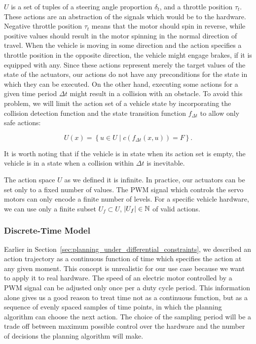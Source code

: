 $U$ is a set of tuples of a steering angle proportion $\delta_t$, and a throttle position $\tau_t$. These actions are an abstraction of the signals which would be to the hardware. Negative throttle position $\tau_t$ means that the motor should spin in reverse, while positive values should result in the motor spinning in the normal direction of travel. When the vehicle is moving in some direction and the action specifies a throttle position in the opposite direction, the vehicle might engage brakes, if it is equipped with any. Since these actions represent merely the target values of the state of the actuators, our actions do not have any preconditions for the state in which they can be executed. On the other hand, executing some actions for a given time period $\Delta t$ might result in a collision with an obstacle. To avoid this problem, we will limit the action set of a vehicle state by incorporating the collision detection function and the state transition function $f_{\Delta t}$ to allow only safe actions:


\[
U(x)=\left\{u\in U \mid c(f_{\Delta t}(x, u)) = F\right\}.
\]

It is worth noting that if the vehicle is in state when its action set is empty, the vehicle is in a state when a collision within $\Delta t$ is inevitable.

The action space $U$ as we defined it is infinite. In practice, our actuators can be set only to a fixed number of values. The \gls*{PWM} signal which controls the servo motors can only encode a finite number of levels. For a specific vehicle hardware, we can use only a finite subset $U_f\subset U$, $\left|{U_f}\right|\in\mathbb{N}$ of valid actions.

\subsubsection{Discrete-Time Model}

Earlier in Section~\ref{sec:planning_under_differential_constraints}, we described an action trajectory as a continuous function of time which specifies the action at any given moment. This concept is unrealistic for our use case because we want to apply it to real hardware. The speed of an electric motor controlled by a \gls{PWM} signal can be adjusted only once per a duty cycle period. This information alone gives us a good reason to treat time not as a continuous function, but as a sequence of evenly spaced samples of time points, in which the planning algorithm can choose the next action. The choice of the sampling period will be a trade off between maximum possible control over the hardware and the number of decisions the planning algorithm will make.


